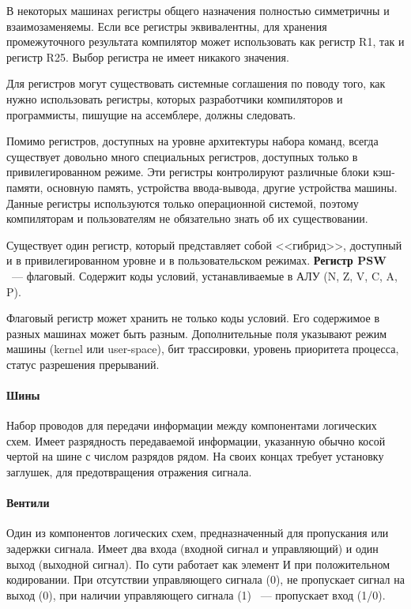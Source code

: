 \documentclass[10pt]{article}
\begin{document}
	В некоторых машинах регистры общего назначения полностью симметричны и взаимозаменяемы. Если все регистры эквивалентны, для хранения промежуточного результата компилятор может использовать как регистр R1, так и регистр R25. Выбор регистра не имеет никакого значения.

	Для регистров могут существовать системные соглашения по поводу того, как нужно использовать регистры, которых разработчики компиляторов и программисты, пишущие на ассемблере, должны следовать.

	Помимо регистров, доступных на уровне архитектуры набора команд, всегда существует довольно много специальных регистров, доступных только в привилегированном режиме. Эти регистры контролируют различные блоки кэш-памяти, основную память, устройства ввода-вывода, другие устройства машины. Данные регистры используются только операционной системой, поэтому компиляторам и пользователям не обязательно знать об их существовании.

	Существует один регистр, который представляет собой <<гибрид>>, доступный и в привилегированном уровне и в пользовательском режимах. \textbf{Регистр PSW} ~--- флаговый. Содержит коды условий, устанавливаемые в АЛУ (N, Z, V, C, A, P).

	Флаговый регистр может хранить не только коды условий. Его содержимое в разных машинах может быть разным. Дополнительные поля указывают режим машины (kernel или user-space), бит трассировки, уровень приоритета процесса, статус разрешения прерываний.
	\paragraph{Шины}
	Набор проводов для передачи информации между компонентами логических схем. Имеет разрядность передаваемой информации, указанную обычно косой чертой на шине с числом разрядов рядом. На своих концах требует установку заглушек, для предотвращения отражения сигнала.
	\paragraph{Вентили}
	Один из компонентов логических схем, предназначенный для пропускания или задержки сигнала. Имеет два входа (входной сигнал и управляющий) и один выход (выходной сигнал). По сути работает как элемент И при положительном кодировании. При отсутствии управляющего сигнала (0), не пропускает сигнал на выход (0), при наличии управляющего сигнала (1) ~--- пропускает вход (1/0).
\end{document}
